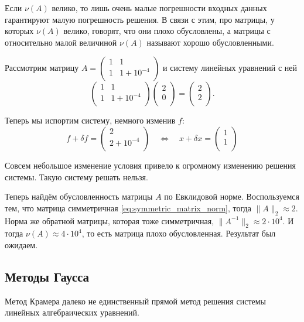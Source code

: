 \documentclass{article}
\begin{document}
Если $\nu(A)$ велико, то лишь очень малые погрешности входных данных гарантируют
малую погрешность решения. В связи с этим, про матрицы, у которых $\nu(A)$
велико, говорят, что они плохо обусловлены, а матрицы с относительно малой
величиной $\nu(A)$ называют хорошо обусловленными.

\begin{example}
	Рассмотрим матрицу
	$A=
		\begin{pmatrix}
			1	& 1 \\
			1	& 1+10^{-4} \\
		\end{pmatrix}
	$
	и систему линейных уравнений с ней
	\[
		\begin{pmatrix}
			1	& 1 \\
			1	& 1+10^{-4} \\
		\end{pmatrix}
		\begin{pmatrix}
			2 \\
			0 \\
		\end{pmatrix}
		=
		\begin{pmatrix}
			2 \\
			2 \\
		\end{pmatrix}
		.
	\]

	Теперь мы испортим систему, немного изменив $f$:
	\[f+\delta f=
		\begin{pmatrix}
			2 \\
			2+10^{-4} \\
		\end{pmatrix}
		\quad\Leftrightarrow\quad
		x+\delta x=
		\begin{pmatrix}
			1 \\
			1 \\
		\end{pmatrix}
	\]

	Совсем небольшое изменение условия привело к огромному изменению
	решения системы. Такую систему решать нельзя.

	Теперь найдём обусловленность матрицы $A$ по Евклидовой норме.
	Воспользуемся тем, что матрица симметричная
	\eqref{eq:symmetric_matrix_norm}, тогда $\|A\|_2\approx 2$.
	Норма же обратной матрицы, которая тоже симметричная,
	$\|A^{-1}\|_2\approx 2\cdot 10^4$. И тогда $\nu(A)\approx
	4\cdot 10^4$, то есть матрица плохо обусловленная. Результат был
	ожидаем.
\end{example}

\subsection{Методы Гаусса}
Метод Крамера далеко не единственный прямой метод решения системы линейных
алгебраических уравнений.
\end{document}
